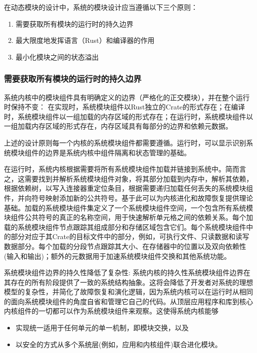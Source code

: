 在动态模块的设计中，系统的模块设计应当遵循以下三个原则： \begin{enumerate}
    \item 需要获取所有模块的运行时的持久边界
    \item 最大限度地发挥语言（Rust）和编译器的作用
    \item 最小化模块之间的状态溢出
\end{enumerate}

\subsubsection{需要获取所有模块的运行时的持久边界}

系统内核中的模块组件具有明确定义的边界（严格化的正交模块），并在整个运行时保持不变： 在实现时，系统模块组件以Rust独立的Crate的形式存在；在编译时，系统模块组件以一组加载的内存区域的形式存在；在运行时，系统模块组件以一组加载内存区域的形式存在，内存区域具有每部分的边界和依赖元数据。

上述的设计原则每一个内核的系统模块组件都需要遵循。运行时，可以显示识别系统模块组件的边界是系统内核中组件隔离和状态管理的基础。

在运行时，系统内核根据需要将所有系统模块组件加载并链接到系统中。简而言之，这需要找到并解析系统模块组件对象，将其部分加载到内存中，解析其依赖，根据依赖树，以写入连接器重定位条目，根据需要递归加载任何丢失的系统模块组件，并向符号映射添加新的公共符号。基于此可以为内核进化和故障恢复提供理论基础。加载的系统模块组件集定义了一个系统模块组件空间，一个包含所有系统模块组件公共符号的真正的名称空间，用于快速解析单元格之间的依赖关系。每个加载的系统模块组件节点跟踪其组成部分和存储区域包含它们。每个系统模块组件中的部分对应于其Crate的目标文件中的部分，例如，可执行文件、只读数据和读写数据部分。每个加载的分段节点跟踪其大小、在存储器中的位置以及双向依赖性(输入和输出)；额外的元数据用于加速系统模块组件交换和其他系统功能。

系统模块组件边界的持久性降低了复杂性: 系统内核的持久性系统模块组件边界在其存在的所有阶段提供了一致的系统结构抽象。这将会降低了开发者对系统的理想模型的复杂性，并简化了故障恢复和演化逻辑，因为系统内核可以在运行时从相同的面向系统模块组件的角度自省和管理它自己的代码。从顶层应用程序和库到核心内核组件的一切都可以作为系统模块组件来观察。这使得系统内核能够

\begin{itemize}
	\item 实现统一适用于任何单元的单一机制，即模块交换，以及
	\item 以安全的方式从多个系统层(例如，应用和内核组件)联合进化模块。
\end{itemize}


